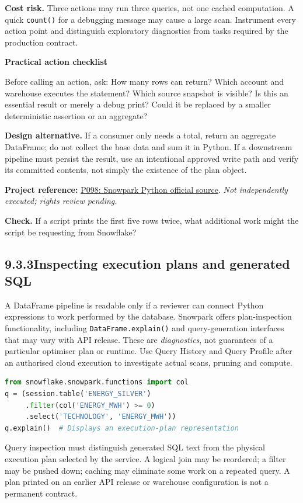 \documentclass[11pt,twoside]{article}
\newcommand{\topic}[2]{\subsection*{#1\quad #2}}
\newcommand{\repo}[2]{\par\begingroup\fontsize{8.0}{9.6}\selectfont\sffamily\color{inkgray}\textbf{Project reference:} \href{#2}{#1}. \textit{Not independently executed; rights review pending.}\par\endgroup}
\begin{document}
\textbf{Cost risk.} Three actions may run three queries, not one cached computation. A quick \texttt{count()} for a debugging message may cause a large scan. Instrument every action point and distinguish exploratory diagnostics from tasks required by the production contract.
\begin{whitebox}\textbf{Practical action checklist}\par
Before calling an action, ask: How many rows can return? Which account and warehouse executes the statement? Which source snapshot is visible? Is this an essential result or merely a debug print? Could it be replaced by a smaller deterministic assertion or an aggregate?\end{whitebox}
\textbf{Design alternative.} If a consumer only needs a total, return an aggregate DataFrame; do not collect the base data and sum it in Python. If a downstream pipeline must persist the result, use an intentional approved write path and verify its committed contents, not simply the existence of the plan object.
\repo{P098: Snowpark Python official source}{https://github.com/snowflakedb/snowpark-python}
\textbf{Check.} If a script prints the first five rows twice, what additional work might the script be requesting from Snowflake?
\newpage
\topic{9.3.3}{Inspecting execution plans and generated SQL}
A DataFrame pipeline is readable only if a reviewer can connect Python expressions to work performed by the database. Snowpark offers plan-inspection functionality, including \texttt{DataFrame.explain()} and query-generation interfaces that may vary with API release. These are \emph{diagnostics}, not guarantees of a particular optimiser plan or runtime. Use Query History and Query Profile after an authorised cloud execution to investigate actual scans, pruning and compute.
\begin{lstlisting}[language=Python,caption={Development-only plan inspection.}]
from snowflake.snowpark.functions import col
q = (session.table('ENERGY_SILVER')
     .filter(col('ENERGY_MWH') >= 0)
     .select('TECHNOLOGY', 'ENERGY_MWH'))
q.explain()  # Displays an execution-plan representation
\end{lstlisting}
Query inspection must distinguish generated SQL text from the physical execution plan selected by the service. A logical join may be reordered; a filter may be pushed down; caching may eliminate some work on a repeated query. A plan printed on an earlier API release or warehouse configuration is not a permanent contract.
\end{document}
